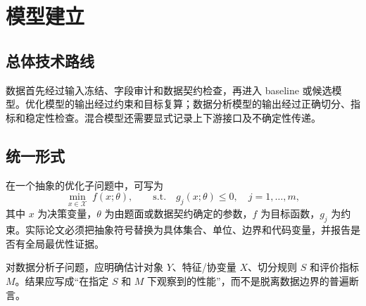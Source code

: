 \section{模型建立}

\subsection{总体技术路线}

数据首先经过输入冻结、字段审计和数据契约检查，再进入 baseline 或候选模型。优化模型的输出经过约束和目标复算；数据分析模型的输出经过正确切分、指标和稳定性检查。混合模型还需要显式记录上下游接口及不确定性传递。

\subsection{统一形式}

在一个抽象的优化子问题中，可写为
\begin{equation}
  \min_{x\in\mathcal{X}}\; f(x;\theta),
  \qquad
  \text{s.t.}\quad g_j(x;\theta)\le 0,\quad j=1,\ldots,m,
  \label{eq:generic-optimization}
\end{equation}
其中 $x$ 为决策变量，$\theta$ 为由题面或数据契约确定的参数，$f$ 为目标函数，$g_j$ 为约束。实际论文必须把抽象符号替换为具体集合、单位、边界和代码变量，并报告是否有全局最优性证据。

对数据分析子问题，应明确估计对象 $Y$、特征/协变量 $X$、切分规则 $S$ 和评价指标 $M$。结果应写成“在指定 $S$ 和 $M$ 下观察到的性能”，而不是脱离数据边界的普遍断言。
